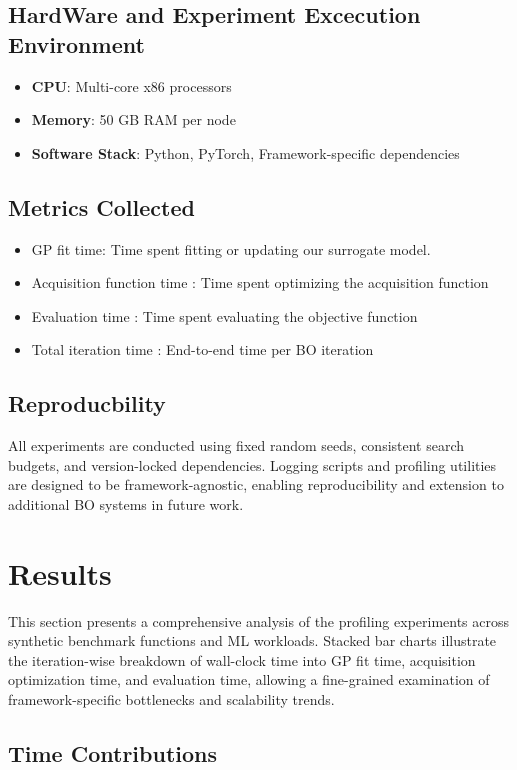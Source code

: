 \documentclass[11pt]{article}
\begin{document}
\subsection{HardWare and Experiment Excecution Environment}
\begin{itemize}
    \item  \textbf{CPU}: Multi-core x86 processors
    \item  \textbf{Memory}: 50 GB RAM per node
    \item  \textbf{Software Stack}: Python, PyTorch, Framework-specific dependencies

\end{itemize}

\subsection{Metrics Collected}
\begin{itemize}
    \item GP fit time: Time spent fitting or updating our surrogate model.
    \item Acquisition function time :  Time spent optimizing the acquisition function
    \item Evaluation time : Time spent evaluating the objective function
    \item Total iteration time : End-to-end time per BO iteration
\end{itemize}
\subsection{Reproducbility}

All experiments are conducted using fixed random seeds, consistent search budgets, and version-locked dependencies. Logging scripts and profiling utilities are designed to be framework-agnostic, enabling reproducibility and extension to additional BO systems in future work.

\section{Results}
This section presents a comprehensive analysis of the profiling experiments across synthetic benchmark functions and ML workloads. Stacked bar charts illustrate the iteration-wise breakdown of wall-clock time into GP fit time, acquisition optimization time, and evaluation time, allowing a fine-grained examination of framework-specific bottlenecks and scalability trends.
\subsection{Time Contributions}
\end{document}
